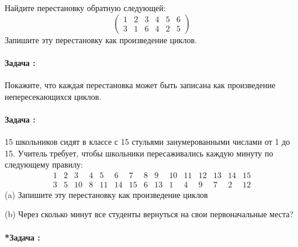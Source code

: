 \documentclass[amsmath,amssymb,12pt]{revtex4}
\newif\ifimportant
\newcommand{\1}{\frac{1}{2}}
\begin{document}
Найдите перестановку обратную следующей:
$$
	\left(
	\begin{array}{cccccc}
		1& 2& 3& 4& 5& 6 \\
		3& 1& 6& 4& 2& 5
	\end{array}
	\right)
$$
Запишите эту перестановку как произведение циклов.



\addtocounter{prn}{1}
\vspace{0.3cm}
\paragraph*{Задача \theprn: }

Покажите, что каждая перестановка может быть записана как произведение непересекающихся циклов.



\addtocounter{prn}{1}
\vspace{0.3cm}
\paragraph*{Задача \theprn: }

15 школьников сидят в классе с 15 стульями занумерованными числами от 1 до 15. Учитель требует, чтобы школьники пересаживались каждую минуту по следующему правилу:
$$
	\begin{array}{ccccccccccccccc}
	1&2&3&4&5&6&7&8&9&10&11&12&13&14&15 \\
	3&5&10&8&11&14&15&6&13&1&4&9&7&2&12
	\end{array}
$$
(a) Запишите эту перестановку как произведение циклов

\noindent
(b) Через сколько минут все студенты вернуться на свои первоначальные места?



\addtocounter{prn}{1}
\vspace{0.3cm}
\paragraph*{*Задача \theprn: }
\end{document}

